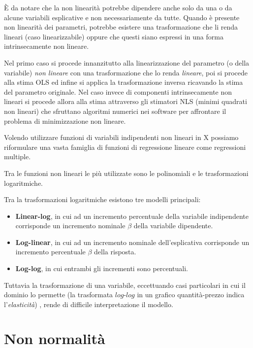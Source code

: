 \documentclass[a4page, 11pt]{article} %
\begin{document}
È da notare che la non linearità potrebbe dipendere anche solo da una o da alcune variabili esplicative e non necessariamente da tutte.
Quando è presente non linearità dei parametri, potrebbe esistere una trasformazione che li renda lineari (caso linearizzabile) oppure che questi siano espressi in una forma intrinsecamente non lineare.

Nel primo caso si procede innanzitutto alla linearizzazione del parametro (o della variabile) \textit{non lineare} con una trasformazione che lo renda \textit{lineare}, poi si procede alla stima OLS ed infine si applica la trasformazione inversa ricavando la stima del parametro originale. 
Nel caso invece di componenti intrinsecamente non lineari si procede allora alla stima attraverso gli stimatori NLS (minimi quadrati non lineari) che sfruttano algoritmi numerici nei software per affrontare il problema di minimizzazione non lineare.

Volendo utilizzare funzioni di variabili indipendenti non lineari in X possiamo riformulare una vasta famiglia di funzioni di regressione lineare come regressioni multiple.

Tra le funzioni non lineari le più utilizzate sono le polinomiali e le trasformazioni logaritmiche. 

Tra la trasformazioni logaritmiche esistono tre modelli principali: 
\begin{itemize}[noitemsep]
\item \textbf{Linear-log}, in cui ad un incremento percentuale della variabile indipendente corrisponde un incremento nominale %
 $\beta$ della variabile dipendente.
\item \textbf{Log-linear}, in cui ad un incremento nominale dell’esplicativa corrisponde un incremento percentuale $\beta$ della risposta.
\item \textbf{Log-log}, in cui entrambi gli incrementi sono percentuali.
\end{itemize}
Tuttavia la trasformazione di una variabile, eccettuando casi particolari in cui il dominio lo permette (la trasformata $log$-$log$ in un grafico quantità-prezzo indica l'\textit{elasticità}) , rende di difficile interpretazione il modello.

\section{Non normalità}
\end{document}

